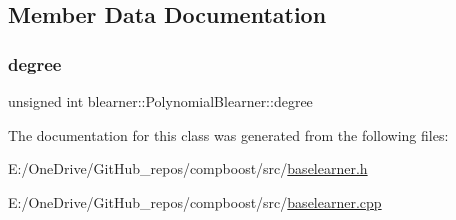 \subsection{Member Data Documentation}
\mbox{\label{classblearner_1_1_polynomial_blearner_a7a522e19634367a4bfad2d6ea532ec44}} 
\subsubsection{\texorpdfstring{degree}{degree}}
{\footnotesize\ttfamily unsigned int blearner\+::\+Polynomial\+Blearner\+::degree\hspace{0.3cm}{\ttfamily [private]}}



The documentation for this class was generated from the following files\+:\begin{DoxyCompactItemize}
\item 
E\+:/\+One\+Drive/\+Git\+Hub\+\_\+repos/compboost/src/\mbox{\hyperlink{baselearner_8h}{baselearner.\+h}}\item 
E\+:/\+One\+Drive/\+Git\+Hub\+\_\+repos/compboost/src/\mbox{\hyperlink{baselearner_8cpp}{baselearner.\+cpp}}\end{DoxyCompactItemize}
